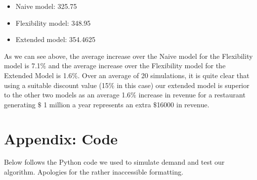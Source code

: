 \documentclass[12pt, titlepage]{article}
\begin{document}
\begin{itemize}
\item Naive model: 325.75
\item Flexibility model: 348.95
\item Extended model: 354.4625
\end{itemize}

As we can see above, the average increase over the Naive model for the Flexibility model is 7.1$\%$  and the average increase over the Flexibility model for the Extended Model is 1.6$\%$. Over an average of 20 simulations, it is quite clear that using a suitable discount value (15$\%$ in this case) our extended model is superior to the other two models as an average 1.6$\%$ increase in revenue for a restaurant generating $\$$ 1 million a year represents an extra $\$$16000 in revenue.

\section{Appendix: Code}

Below follows the Python code we used to simulate demand and test our algorithm. Apologies for the rather inaccessible formatting.
\end{document}
